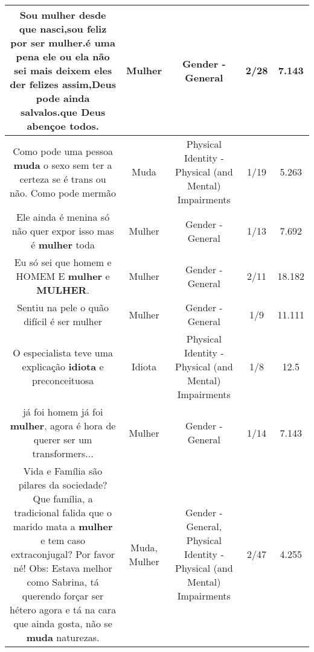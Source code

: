 \documentclass[11pt]{article}
\newlength\mylength
\begin{document}
\begin{center}
\begin{longtable}{|C{.65\mylength}|C{.30\mylength}|C{.12\mylength}|C{.12\mylength}|C{.12\mylength}|}
  \small Sou \textbf{mulher} desde que nasci,sou feliz  por ser \textbf{mulher}.é uma pena ele ou ela não sei mais deixem eles  der felizes assim,Deus pode ainda salvalos.que Deus abençoe todos.\normalsize   & Mulher & Gender - General & 2/28 & 7.143 \\  \hline
  \small Como pode uma pessoa \textbf{muda} o sexo sem ter a certeza se é trans ou não. Como pode mermão\normalsize   & Muda & Physical Identity - Physical (and Mental) Impairments & 1/19 & 5.263 \\  \hline
  \small Ele ainda é  menina só não quer expor isso mas é \textbf{mulher} toda\normalsize   & Mulher & Gender - General & 1/13 & 7.692 \\  \hline
  \small Eu só sei que homem e HOMEM E \textbf{mulher} e \textbf{MULHER}.\normalsize   & Mulher & Gender - General & 2/11 & 18.182 \\  \hline
  \small Sentiu na pele o quão difícil é ser mulher\normalsize   & Mulher & Gender - General & 1/9 & 11.111 \\  \hline
  \small O especialista teve uma explicação \textbf{idiota} e preconceituosa\normalsize   & Idiota & Physical Identity - Physical (and Mental) Impairments & 1/8 & 12.5 \\  \hline
  \small já foi homem já foi \textbf{mulher}, agora é hora de querer ser um transformers...\normalsize   & Mulher & Gender - General & 1/14 & 7.143 \\  \hline
  \small Vida e Família são pilares da sociedade? Que família, a tradicional falida que o marido mata a \textbf{mulher} e tem caso extraconjugal? Por favor né! Obs: Estava melhor como Sabrina, tá querendo forçar ser hétero agora e tá na cara que ainda gosta, não se \textbf{muda} naturezas.\normalsize   & Muda, Mulher & Gender - General, Physical Identity - Physical (and Mental) Impairments & 2/47 & 4.255 \\  \hline

\end{longtable}
\end{center}
\end{document}

